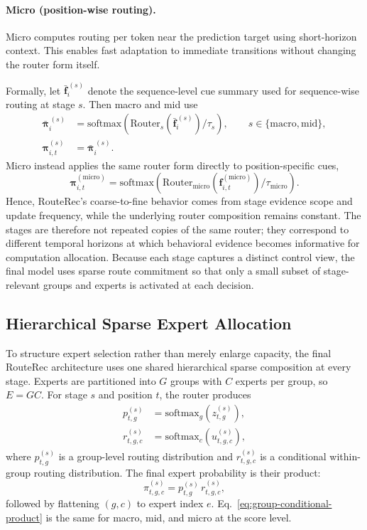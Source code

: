 \documentclass[sigconf,review,anonymous]{acmart}
\begin{document}
\paragraph{Micro (position-wise routing).}
Micro computes routing per token near the prediction target using short-horizon context. This enables fast adaptation to immediate transitions without changing the router form itself.

Formally, let $\bar{\mathbf{f}}_i^{\,(s)}$ denote the sequence-level cue summary used for sequence-wise routing at stage $s$. Then macro and mid use
\[
\begin{aligned}
\bar{\boldsymbol{\pi}}_i^{\,(s)}
&=
\mathrm{softmax}\!\left(\mathrm{Router}_s(\bar{\mathbf{f}}_i^{\,(s)})/\tau_s\right),
\qquad s\in\{\mathrm{macro},\mathrm{mid}\}, \\
\boldsymbol{\pi}^{(s)}_{i,t}
&=
\bar{\boldsymbol{\pi}}_i^{\,(s)}.
\end{aligned}
\]
Micro instead applies the same router form directly to position-specific cues,
\[
\boldsymbol{\pi}^{(\mathrm{micro})}_{i,t}
=
\mathrm{softmax}\!\left(\mathrm{Router}_{\mathrm{micro}}(\mathbf{f}^{(\mathrm{micro})}_{i,t})/\tau_{\mathrm{micro}}\right).
\]
Hence, RouteRec's coarse-to-fine behavior comes from stage evidence scope and update frequency, while the underlying router composition remains constant. The stages are therefore not repeated copies of the same router; they correspond to different temporal horizons at which behavioral evidence becomes informative for computation allocation. Because each stage captures a distinct control view, the final model uses sparse route commitment so that only a small subset of stage-relevant groups and experts is activated at each decision.

\subsection{Hierarchical Sparse Expert Allocation}
\label{sec:hierarchical-routing}

To structure expert selection rather than merely enlarge capacity, the final RouteRec architecture uses one shared hierarchical sparse composition at every stage. Experts are partitioned into $G$ groups with $C$ experts per group, so $E=GC$. For stage $s$ and position $t$, the router produces
\begin{align}
p^{(s)}_{t,g} &= \mathrm{softmax}_g\!\left(z^{(s)}_{t,g}\right), \\
r^{(s)}_{t,g,c} &= \mathrm{softmax}_c\!\left(u^{(s)}_{t,g,c}\right),
\end{align}
where $p^{(s)}_{t,g}$ is a group-level routing distribution and $r^{(s)}_{t,g,c}$ is a conditional within-group routing distribution. The final expert probability is their product:
\begin{equation}
\pi^{(s)}_{t,g,c}=p^{(s)}_{t,g}\,r^{(s)}_{t,g,c},
\label{eq:group-conditional-product}
\end{equation}
followed by flattening $(g,c)$ to expert index $e$. Eq.~\eqref{eq:group-conditional-product} is the same for macro, mid, and micro at the score level.
\end{document}
